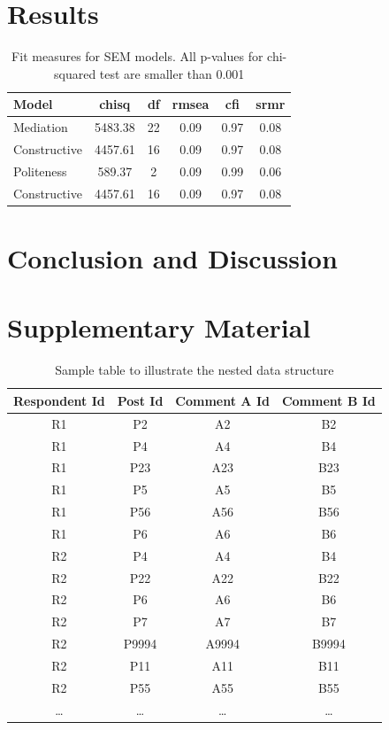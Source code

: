 \documentclass{article}
\begin{document}
\section{Results}

\begin{table}[H]
\centering
\caption{\label{tab:sem-fit-measures}Fit measures for SEM models. All p-values for chi-squared test are smaller than 0.001}
\centering
\begin{tabular}[t]{lccccc}
\toprule
Model & chisq & df & rmsea & cfi & srmr\\
\midrule
Mediation & 5483.38 & 22 & 0.09 & 0.97 & 0.08\\
\cmidrule{1-6}
Constructive & 4457.61 & 16 & 0.09 & 0.97 & 0.08\\
\cmidrule{1-6}
Politeness & 589.37 & 2 & 0.09 & 0.99 & 0.06\\
\cmidrule{1-6}
Constructive & 4457.61 & 16 & 0.09 & 0.97 & 0.08\\
\bottomrule
\end{tabular}
\end{table}





\section{Conclusion and Discussion}


\newpage



\clearpage
\section{Supplementary Material}

\begin{table}[htbp]
    \centering
    \begin{tabular}{|c|c|c|c|}
    \hline
    \textbf{Respondent Id} & \textbf{Post Id} & \textbf{Comment A Id} & \textbf{Comment B Id} \\
    \hline
    R1 & P2 & A2 & B2 \\
    R1 & P4 & A4 & B4 \\
    R1 & P23 & A23 & B23 \\
    R1 & P5 & A5 & B5 \\
    R1 & P56 & A56 & B56 \\
    R1 & P6 & A6 & B6 \\
    \midrule
    R2 & P4 & A4 & B4 \\
    R2 & P22 & A22 & B22 \\
    R2 & P6 & A6 & B6 \\
    R2 & P7 & A7 & B7 \\
    R2 & P9994 & A9994 & B9994 \\
    R2 & P11 & A11 & B11 \\
    R2 & P55 & A55 & B55 \\
    \midrule
    \dots & \dots & \dots & \dots \\
    \hline
    \end{tabular}
    \caption{Sample table to illustrate the nested data structure}
    \label{sample-table}
\end{table}
\end{document}
